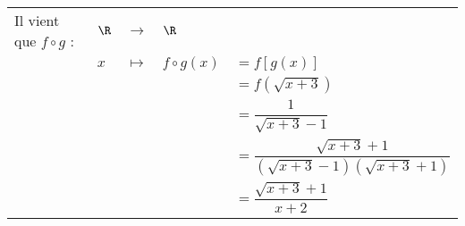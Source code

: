\begin{tabular}{lllll}
Il vient que $f \circ g$ : & $\R$ & $\longrightarrow$ & $\R$ & \\
& $x$ & $\longmapsto$ & $f \circ g\left(x\right) $ & $= f\left[g\left(x\right)\right]$ \vspace*{.3cm} \\
& & & & $=f\left(\sqrt{x+3}\right)$ \vspace*{.3cm} \\
& & & & $= \dfrac{1}{\sqrt{x+3} - 1}$ \vspace*{.3cm} \\
& & & & $= \dfrac{\sqrt{x+3} +1}{\left(\sqrt{x+3} - 1\right)\left(\sqrt{x+3}+1\right)}$ \vspace*{.3cm} \\ 
& & & & $= \dfrac{\sqrt{x+3} +1}{x+2}$ \vspace*{.3cm} \\ 
\end{tabular}


\ifdefined\COMPLETE
\else
    
\fi